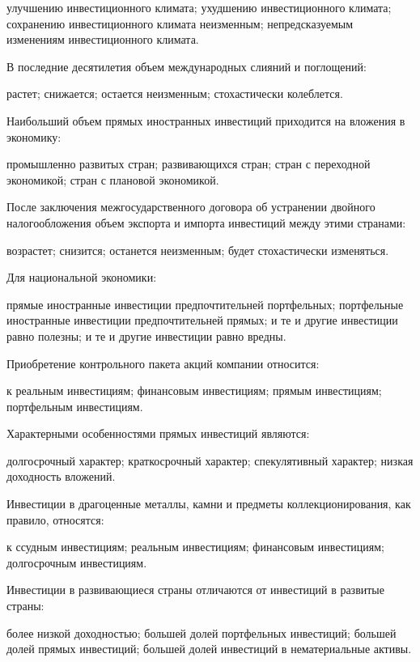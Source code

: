 \documentclass[12pt, table]{exam}
\begin{document}
\begin{questions}
\begin{multicols}{2}
\begin{choices}
	 \CC улучшению инвестиционного климата;
	 \choice ухудшению инвестиционного климата;
	 \choice сохранению инвестиционного климата неизменным;
	 \choice непредсказуемым изменениям  инвестиционного климата.
	 \end{choices}
\question  В последние десятилетия объем международных слияний и поглощений:
	 \begin{choices}
	 \CC растет;
	 \choice снижается;
	 \choice остается неизменным;
	 \choice стохастически колеблется.
	 \end{choices}
\question  Наибольший объем прямых иностранных инвестиций приходится на вложения в экономику:
	 \begin{choices}
	 \CC промышленно развитых стран;
	 \choice развивающихся стран;
	 \choice стран с переходной экономикой;
	 \choice стран с плановой экономикой.
	 \end{choices}
\question  После заключения межгосударственного договора об устранении двойного налогообложения объем экспорта и импорта инвестиций между этими странами:
	 \begin{choices}
	 \CC возрастет;
	 \choice снизится;
	 \choice останется неизменным;
	 \choice будет стохастически изменяться.
	 \end{choices}
\question  Для национальной экономики:
	 \begin{choices}
	 \CC прямые иностранные инвестиции предпочтительней портфельных;
	 \choice портфельные иностранные инвестиции предпочтительней прямых;
	 \choice и те и другие инвестиции равно полезны;
	 \choice и те и другие инвестиции равно вредны.
	 \end{choices}
\question  Приобретение контрольного пакета акций компании относится:
	 \begin{choices}
	 \choice к реальным инвестициям;
	 \choice финансовым инвестициям;
	 \CC прямым инвестициям;
	 \choice портфельным инвестициям.
	 \end{choices}
\question  Характерными особенностями прямых инвестиций являются:
	 \begin{choices}
	 \CC долгосрочный характер;
	 \choice краткосрочный характер;
	 \choice спекулятивный характер;
	 \choice низкая доходность вложений.
	 \end{choices}
\question  Инвестиции в драгоценные металлы, камни и предметы коллекционирования, как правило, относятся:
	 \begin{choices}
	 \choice к ссудным инвестициям;
	 \choice реальным инвестициям;
	 \choice финансовым инвестициям;
	 \CC долгосрочным инвестициям.
	 \end{choices}
\question  Инвестиции в развивающиеся страны отличаются от инвестиций в развитые страны:
	 \begin{choices}
	 \choice более низкой доходностью;
	 \choice большей долей портфельных инвестиций;
	 \CC большей долей прямых инвестиций;
	 \choice большей долей инвестиций в нематериальные активы.
	 \end{choices}



\end{multicols}
\end{questions}
\end{document}
